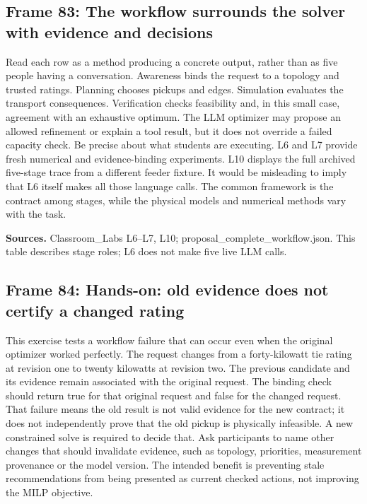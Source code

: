 \documentclass[11pt]{article}
\begin{document}
\subsection*{Frame 83: The workflow surrounds the solver with evidence and decisions}
Read each row as a method producing a concrete output, rather than as five people having a conversation. Awareness binds the request to a topology and trusted ratings. Planning chooses pickups and edges. Simulation evaluates the transport consequences. Verification checks feasibility and, in this small case, agreement with an exhaustive optimum. The LLM optimizer may propose an allowed refinement or explain a tool result, but it does not override a failed capacity check. Be precise about what students are executing. L6 and L7 provide fresh numerical and evidence-binding experiments. L10 displays the full archived five-stage trace from a different feeder fixture. It would be misleading to imply that L6 itself makes all those language calls. The common framework is the contract among stages, while the physical models and numerical methods vary with the task.\par
\par\nopagebreak\begin{minipage}{\linewidth}{\footnotesize\color{slate}\textbf{Sources.} Classroom\_Labs L6--L7, L10; proposal\_complete\_workflow.json. This table describes stage roles; L6 does not make five live LLM calls.\par}\end{minipage}\par\medskip
\subsection*{Frame 84: Hands-on: old evidence does not certify a changed rating}
This exercise tests a workflow failure that can occur even when the original optimizer worked perfectly. The request changes from a forty-kilowatt tie rating at revision one to twenty kilowatts at revision two. The previous candidate and its evidence remain associated with the original request. The binding check should return true for that original request and false for the changed request. That failure means the old result is not valid evidence for the new contract; it does not independently prove that the old pickup is physically infeasible. A new constrained solve is required to decide that. Ask participants to name other changes that should invalidate evidence, such as topology, priorities, measurement provenance or the model version. The intended benefit is preventing stale recommendations from being presented as current checked actions, not improving the MILP objective.\par
\end{document}
